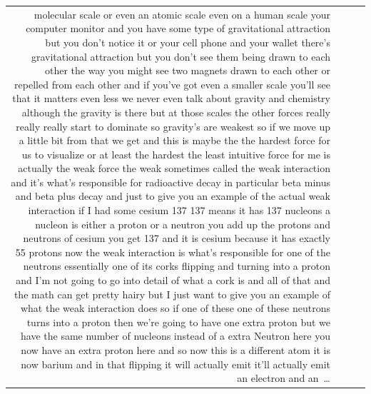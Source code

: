 \documentclass[10pt]{article}
\begin{document}
\begin{tiny}
\begin{longtable}{r p{0.3in} p{1.212in} p{3.8in}}
molecular scale or even an atomic scale even on a human scale your computer monitor and you have some type of gravitational attraction but you don't notice it or your cell phone and your wallet there's gravitational attraction but you don't see them being drawn to each other the way you might see two magnets drawn to each other or repelled from each other and if you've got even a smaller scale you'll see that it matters even less we never even talk about gravity and chemistry although the gravity is there but at those scales the other forces really really really start to dominate so gravity's are weakest so if we move up a little bit from that we get and this is maybe the the hardest force for us to visualize or at least the hardest the least intuitive force for me is actually the weak force the weak sometimes called the weak interaction and it's what's responsible for radioactive decay in particular beta minus and beta plus decay and just to give you an example of the actual weak interaction if I had some cesium 137 137 means it has 137 nucleons a nucleon is either a proton or a neutron you add up the protons and neutrons of cesium you get 137 and it is cesium because it has exactly 55 protons now the weak interaction is what's responsible for one of the neutrons essentially one of its corks flipping and turning into a proton and I'm not going to go into detail of what a cork is and all of that and the math can get pretty hairy but I just want to give you an example of what the weak interaction does so if one of these one of these neutrons turns into a proton then we're going to have one extra proton but we have the same number of nucleons instead of a extra Neutron here you now have an extra proton here and so now this is a different atom it is now barium and in that flipping it will actually emit it'll actually emit an electron and an~\ldots \\

\end{longtable}
\end{tiny}
\end{document}
